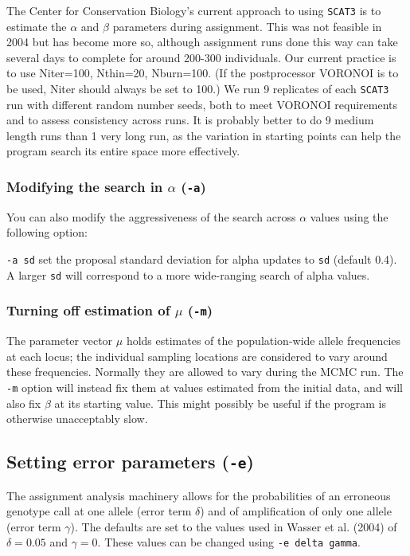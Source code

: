 \documentclass[10pt,titlepage,times,letterpaper]{article}
\def\SCAT{{\tt SCAT3} }
\begin{document}
The Center for Conservation Biology's current approach
to using \SCAT is to estimate the $\alpha$ and $\beta$ parameters during
assignment.  This was not feasible in 2004 but has become more so, although
assignment runs done this way can take several days to complete for around
200-300 individuals.  Our current practice is to use Niter=100, Nthin=20,
Nburn=100.  (If the postprocessor VORONOI is to be used, Niter should
always be set to 100.)  We run 9 replicates of each \SCAT run with
different random number seeds, both to meet VORONOI requirements and
to assess consistency across runs.  It is probably better to do 9
medium length runs than 1 very long run, as the variation in starting
points can help the program search its entire space more effectively.

\subsubsection{Modifying the search in $\alpha$  ({\tt -a})}

You can also modify the aggressiveness of the search across $\alpha$
values using the following option:

{\tt -a sd} set the proposal standard deviation for alpha updates to
{\tt sd} (default 0.4).  A larger {\tt sd} will correspond to a more
wide-ranging search of alpha values.

\subsubsection{Turning off estimation of $\mu$ ({\tt -m})}

The parameter vector $\mu$ holds estimates of the population-wide
allele frequencies at each locus; the individual sampling locations
are considered to vary around these frequencies.  Normally they
are allowed to vary during the MCMC run.  The {\tt -m} option
will instead fix them at values estimated from the initial data,
and will also fix $\beta$ at its starting value.
This might possibly be useful if the program is otherwise
unacceptably slow.

\subsection{Setting error parameters ({\tt -e})}

The assignment analysis machinery allows for the probabilities
of an erroneous genotype call at one allele
(error term $\delta$) and of amplification of only one allele (error term
$\gamma$).  The defaults are set to the values used in Wasser et al. (2004)
of $\delta = 0.05$ and $\gamma = 0$.  These values can be changed
using {\tt -e delta gamma}.
\end{document}
